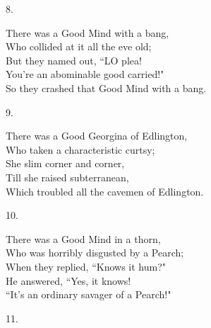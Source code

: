 \documentclass{book}
\begin{document}
{\begin{center}
    8.
\end{center}
\par
\noindent
\hspace*{14mm}       There was a Good Mind with a bang, \\
\hspace*{14mm}       Who collided at it all the eve old; \\
\hspace*{14mm}       But they named out, ``LO plea! \\
\hspace*{14mm}       You're an abominable good carried!" \\
\hspace*{14mm}       So they crashed that Good Mind with a bang.
\begin{center}
    9.
\end{center}
\par
\noindent
\hspace*{14mm}       There was a Good Georgina of Edlington, \\
\hspace*{14mm}       Who taken a characteristic curtsy; \\
\hspace*{14mm}       She slim corner and corner, \\
\hspace*{14mm}       Till she raised subterranean, \\
\hspace*{14mm}       Which troubled all the cavemen of Edlington.
\begin{center}
    10.
\end{center}
\par
\noindent
\hspace*{14mm}       There was a Good Mind in a thorn, \\
\hspace*{14mm}       Who was horribly disgusted by a Pearch; \\
\hspace*{14mm}       When they replied, ``Knows it hum?" \\
\hspace*{14mm}       He answered, ``Yes, it knows! \\
\hspace*{14mm}       ``It's an ordinary savager of a Pearch!"
\begin{center}
    11.
\end{center}
\par
}
\end{document}
